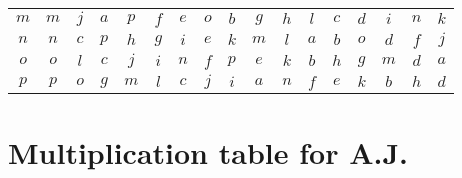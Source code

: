 \documentclass[12pt]{amsart}
\begin{document}
\begin{center}
\begin{tabular}{c|cccccccccccccccc}
	\(m\)  & \(m\)  & \(j\)  & \(a\)  & \(p\)  & \(f\)  & \(e\)  & \(o\)  & \(b\)  & \(g\)  & \(h\)  & \(l\)  & \(c\)  & \(d\)  & \(i\)  & \(n\)  & \(k\)  \\
	\(n\)  & \(n\)  & \(c\)  & \(p\)  & \(h\)  & \(g\)  & \(i\)  & \(e\)  & \(k\)  & \(m\)  & \(l\)  & \(a\)  & \(b\)  & \(o\)  & \(d\)  & \(f\)  & \(j\)  \\
	\(o\)  & \(o\)  & \(l\)  & \(c\)  & \(j\)  & \(i\)  & \(n\)  & \(f\)  & \(p\)  & \(e\)  & \(k\)  & \(b\)  & \(h\)  & \(g\)  & \(m\)  & \(d\)  & \(a\)  \\
	\(p\)  & \(p\)  & \(o\)  & \(g\)  & \(m\)  & \(l\)  & \(c\)  & \(j\)  & \(i\)  & \(a\)  & \(n\)  & \(f\)  & \(e\)  & \(k\)  & \(b\)  & \(h\)  & \(d\)  
\end{tabular}\end{center}\clearpage

\section*{Multiplication table for A.J.}
\end{document}
